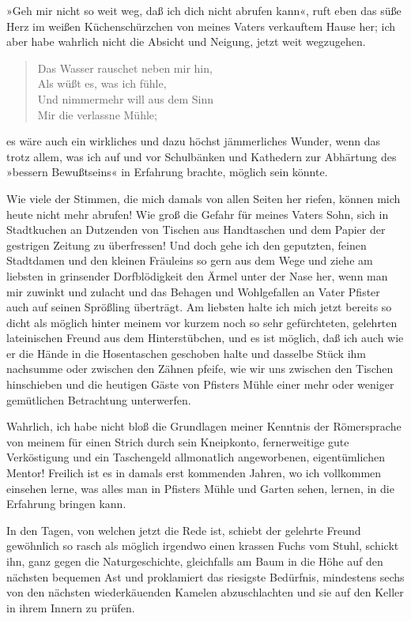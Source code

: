 »Geh mir nicht so weit weg, daß ich dich nicht abrufen kann«, ruft
eben das süße Herz im weißen Küchenschürzchen von meines Vaters
verkauftem Hause her; ich aber habe wahrlich nicht die Absicht und
Neigung, jetzt weit wegzugehen.

\begin{verse}
Das Wasser rauschet neben mir hin,\\
Als wüßt es, was ich fühle,\\
Und nimmermehr will aus dem Sinn\\
Mir die verlassne Mühle;
\end{verse}
\noindent
es wäre auch ein wirkliches und dazu höchst
jämmerliches Wunder, wenn das trotz allem, was ich auf und vor
Schulbänken und Kathedern zur Abhärtung des »bessern Bewußtseins«
in Erfahrung brachte, möglich sein könnte.

Wie viele der Stimmen, die mich damals von allen Seiten her riefen,
können mich heute nicht mehr abrufen! Wie groß die Gefahr für
meines Vaters Sohn, sich in Stadtkuchen an Dutzenden von Tischen
aus Handtaschen und dem Papier der gestrigen Zeitung zu
überfressen! Und doch gehe ich den geputzten, feinen Stadtdamen und
den kleinen Fräuleins so gern aus dem Wege und ziehe am liebsten in
grinsender Dorfblödigkeit den Ärmel unter der Nase her, wenn man
mir zuwinkt und zulacht und das Behagen und Wohlgefallen an Vater
Pfister auch auf seinen Sprößling überträgt. Am liebsten halte ich
mich jetzt bereits so dicht als möglich hinter meinem vor kurzem
noch so sehr gefürchteten, gelehrten lateinischen Freund aus dem
Hinterstübchen, und es ist möglich, daß ich auch wie er die Hände
in die Hosentaschen geschoben halte und dasselbe Stück ihm
nachsumme oder zwischen den Zähnen pfeife, wie wir uns zwischen den
Tischen hinschieben und die heutigen Gäste von Pfisters Mühle einer
mehr oder weniger gemütlichen Betrachtung unterwerfen.

Wahrlich, ich habe nicht bloß die Grundlagen meiner Kenntnis der
Römersprache von meinem für einen Strich durch sein Kneipkonto,
fernerweitige gute Verköstigung und ein Taschengeld allmonatlich
angeworbenen, eigentümlichen Mentor! Freilich ist es in damals erst
kommenden Jahren, wo ich vollkommen einsehen lerne, was alles man
in Pfisters Mühle und Garten sehen, lernen, in die Erfahrung
bringen kann.

In den Tagen, von welchen jetzt die Rede ist, schiebt der gelehrte
Freund gewöhnlich so rasch als möglich irgendwo einen krassen Fuchs
vom Stuhl, schickt ihn, ganz gegen die Naturgeschichte, gleichfalls
am Baum in die Höhe auf den nächsten bequemen Ast und proklamiert
das riesigste Bedürfnis, mindestens sechs von den nächsten
wiederkäuenden Kamelen abzuschlachten und sie auf den Keller in
ihrem Innern zu prüfen.

